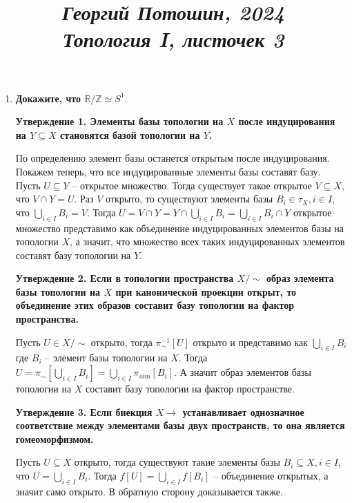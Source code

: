 \documentclass{article}
\title{
\textit{\small{Георгий Потошин, 2024}}\\
\vspace{0.3ex}
\textit{\huge{Топология I, листочек 3}}\vspace{1ex}
}
\date{\vspace{-10ex}}
\begin{document}
\maketitle

\begin{enumerate}
    \item \textbf{Докажите, что $\mathbb{R}/\mathbb{Z}\simeq S^1.$}\par
        \textbf{Утверждение 1. Элементы базы топологии на $X$ после
        индуцирования на $Y\subseteq X$ становятся базой топологии на $Y$.}\par
        По определению элемент базы останется открытым после индуцирования.
        Покажем теперь, что все индуцированные элементы базы составят
        базу. Пусть $U\subseteq Y$ – открытое множество. Тогда существует такое
        открытое $V\subseteq X$, что $V\cap Y=U$. Раз $V$ открыто, то
        существуют элементы базы $B_i\in \tau_X,i\in I$, что $\bigcup_{i\in I}
        B_i = V$. Тогда $U=V\cap Y=Y\cap\bigcup_{i\in I}B_i=\bigcup_{i\in I}B_i
        \cap Y$ открытое множество представимо как объединение индуцированных
        элементов базы на топологии $X$, а значит, что множество всех таких
        индуцированных элементов составят базу топологии на $Y$.\par

        \textbf{Утверждение 2. Если в топологии пространства $X/\sim$ образ
        элемента базы топологии на $X$ при канонической проекции открыт, то
        объединение этих образов составит базу топологии на фактор пространства.}
        \par Пусть $U\in X/\sim$ открыто, тогда $\pi_{\sim}^{-1}[U]$ открыто и
        представимо как $\bigcup_{i\in I}B_i$ где $B_i$ – элемент базы топологии
        на $X$. Тогда $U=\pi_{\sim}[\bigcup_{i\in I}B_i]=\bigcup_{i\in I}\pi_{sim}
        [B_i]$. А значит образ элементов базы топологии на $X$ составит базу
        топологии на фактор пространстве.\par

        \textbf{Утверждение 3. Если биекция $X\longrightarrow$ устанавливает
        однозначное соответствие между элементами базы двух пространств, то
        она является гомеоморфизмом.}\par
        Пусть $U\subseteq X$ открыто, тогда существуют такие элементы базы
        $B_i\subseteq X,i\in I$, что $U=\bigcup_{i\in I}B_i$. Тогда $f[U]=
        \bigcup_{i\in I}f[B_i]$ – объединение открытых, а значит само открыто.
        В обратную сторону доказывается также.


\end{enumerate}
\end{document}
